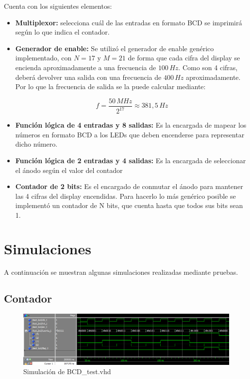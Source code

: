 \documentclass[10pt,spanish,a4paper,openany,notitlepage]{article}
\begin{document}
Cuenta con los siguientes elementos:

\begin{itemize}

\item{\bf Multiplexor:} selecciona cuál de las entradas en formato BCD
se imprimirá según lo que indica el contador.

\item{\bf Generador de enable:} Se utilizó el generador de enable genérico
implementado, con $N = 17$ y $M = 21$ de forma que cada cifra del display
se encienda aproximadamente a una frecuencia de $100\, \unit{Hz}$. Como
son 4 cifras, deberá devolver una salida con una frecuencia de $400\, \unit{Hz}$
aproximadamente. Por lo que la frecuencia de salida se la puede calcular mediante:

\[ \displaystyle f = \frac{50\, \unit{MHz}}{2^{17}} \approx 381,5\, \unit{Hz} \]

\item{\bf Función lógica de 4 entradas y 8 salidas:} Es la encargada
de mapear los números en formato BCD a los LEDs que deben encenderse para
representar dicho número.

\item{\bf Función lógica de 2 entradas y 4 salidas:} Es la encargada
de seleccionar el ánodo según el valor del contador

\item{\bf Contador de 2 bits:} Es el encargado de conmutar el ánodo para mantener 
las 4 cifras del display encendidas. Para hacerlo lo más genérico posible
se implementó un contador de N bits, que cuenta hasta que todos sus
bits sean 1.

\end{itemize}

\section{Simulaciones}

A continuación se muestran algunas simulaciones realizadas mediante pruebas.

\subsection{Contador}

\begin{figure}[H] %
\begin{center}
\includegraphics[scale=0.6]{./imagenes/BCD.png}
\caption{Simulación de BCD\_test.vhd}
 \label{fig:sim_BCD}
\end{center}
\end{figure}
\end{document}
